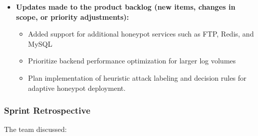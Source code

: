 \documentclass{article}
\begin{document}
\begin{itemize}
    \item \textbf{Updates made to the product backlog (new items, changes in scope, or priority adjustments):}
    \begin{itemize}
        \item Added support for additional honeypot services such as FTP, Redis, and MySQL
        \item Prioritize backend performance optimization for larger log volumes
        \item Plan implementation of heuristic attack labeling and decision rules for adaptive honeypot deployment.
    \end{itemize}

\end{itemize}

\subsubsection{Sprint Retrospective}

The team discussed:
\end{document}
